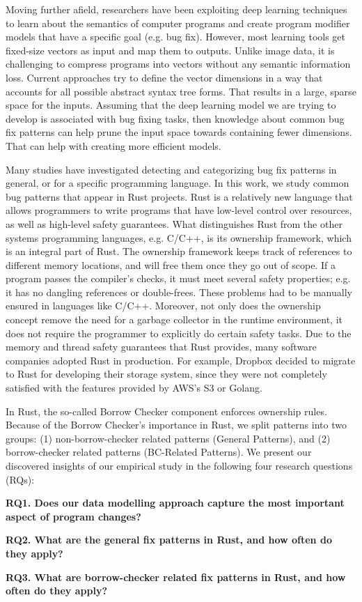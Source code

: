 Moving further afield, researchers have been exploiting deep learning techniques to learn about the semantics of computer programs and create program modifier models that have a specific goal (e.g. bug fix). However, most learning tools get fixed-size vectors as input and map them to outputs. Unlike image data, it is challenging to compress programs into vectors without any semantic information loss. Current approaches try to define the vector dimensions in a way that accounts for all possible abstract syntax tree forms. That results in a large, sparse space for the inputs. Assuming that the deep learning model we are trying to develop is associated with bug fixing tasks, then knowledge about common bug fix patterns can help prune the input space towards containing fewer dimensions. That can help with creating more efficient models.


Many studies have investigated detecting and categorizing bug fix patterns in general, or for a specific programming language. In this work, we study common bug patterns that appear in Rust projects. Rust is a relatively new language that allows programmers to write programs that have low-level control over resources, as well as high-level safety guarantees. What distinguishes Rust from the other systems programming languages, e.g. C/C++, is its ownership framework, which is an integral part of Rust. The ownership framework keeps track of references to different memory locations, and will free them once they go out of scope. If a program passes the compiler’s checks, it must meet several safety properties; e.g. it has no dangling references or double-frees. These problems had to be manually ensured in languages like C/C++. Moreover, not only does the ownership concept remove the need for a garbage collector in the runtime environment, it does not require the programmer to explicitly do certain safety tasks. Due to the memory and thread safety guarantees that Rust provides, many software companies adopted Rust in production. For example, Dropbox decided to migrate to Rust for developing their storage system, since they were not completely satisfied with the features provided by AWS’s S3 or Golang.

In Rust, the so-called Borrow Checker component enforces ownership rules. Because of the Borrow Checker's importance in Rust, we split patterns into two groups: (1) non-borrow-checker related patterns (General Patterns), and (2) borrow-checker related patterns (BC-Related Patterns). We present our discovered insights of our empirical study in the following four research
questions (RQs):


\textbf{RQ1. Does our data modelling approach capture the most important aspect of program changes?} 

\textbf{RQ2. What are the general fix patterns in Rust, and how often do they apply?} 

\textbf{RQ3. What are borrow-checker related fix patterns in Rust, and how often do they apply?}






